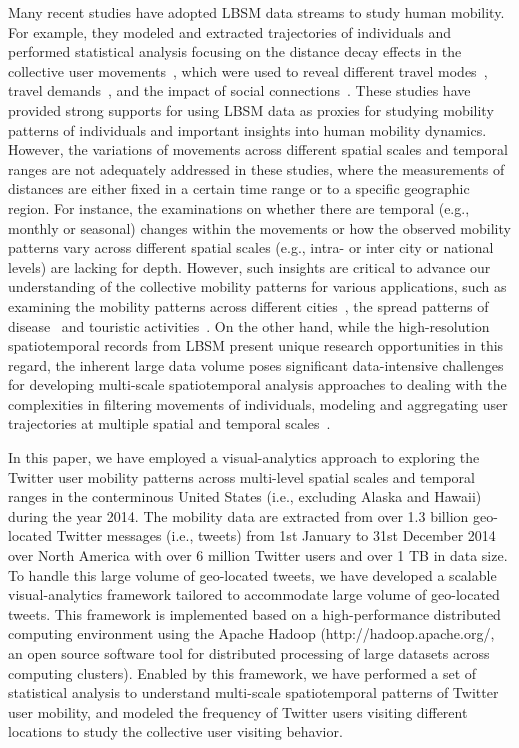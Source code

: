 \documentclass[ijgi,article,accept,moreauthors,pdftex,10pt,a4paper]{mdpi}
\theoremstyle{mdpi}
\newcounter{ex}
\newcounter{re}
\theoremstyle{mdpidefinition}
\begin{document}
Many recent studies have adopted LBSM data streams to study human mobility.
For example, they modeled and extracted trajectories of individuals and performed statistical analysis focusing on the distance decay effects in the collective user movements~\cite{gonzalez2008understanding}, which were used to reveal different travel modes~\cite{Jurdak2015}, travel demands~\cite{wu2014intra,hasan2013understanding}, and the impact of social connections~\cite{cho2011friendship}.
These studies have provided strong supports for using LBSM data as proxies for studying mobility patterns of individuals and important insights into human mobility dynamics.
However, the variations of movements across different spatial scales and temporal ranges are not adequately addressed in these studies, where the measurements of distances are either fixed in a certain time range or to a specific geographic region.
For instance, the examinations on whether there are temporal (e.g., monthly or seasonal) changes within the movements or how the observed mobility patterns vary across different spatial scales (e.g., intra- or inter city or national levels) are lacking for depth.
However, such insights are critical to advance our understanding of the collective mobility patterns for various applications, such as examining the mobility patterns across different cities~\cite{noulas2012tale}, the spread patterns of disease~\cite{balcan2009multiscale, tamerius2011global} and touristic activities~\cite{hawelka2014geo}.
On the other hand, while the high-resolution spatiotemporal records from LBSM present unique research opportunities in this regard, the inherent large data volume poses significant data-intensive challenges for developing multi-scale spatiotemporal analysis approaches to dealing with the complexities in filtering movements of individuals, modeling and aggregating user trajectories at multiple spatial and temporal scales~\cite{tsou2015}.

In this paper, we have employed a visual-analytics approach to exploring the Twitter user mobility patterns across multi-level spatial scales and temporal ranges in the conterminous United States (i.e., excluding Alaska and Hawaii) during the year 2014.
The mobility data are extracted from over 1.3 billion geo-located Twitter messages (i.e., tweets) from 1st January to 31st December 2014 over North America with over 6 million Twitter users and over 1 TB in data size.
To handle this large volume of geo-located tweets, we have developed a scalable visual-analytics framework tailored to accommodate large volume of geo-located tweets.
This framework is implemented based on a high-performance distributed computing environment using the Apache Hadoop (http://hadoop.apache.org/, an open source software tool for distributed processing of large datasets across computing clusters).
Enabled by this framework, we have performed a set of statistical analysis to understand multi-scale spatiotemporal patterns of Twitter user mobility, and modeled the frequency of Twitter users visiting different locations to study the collective user visiting behavior.
\end{document}
